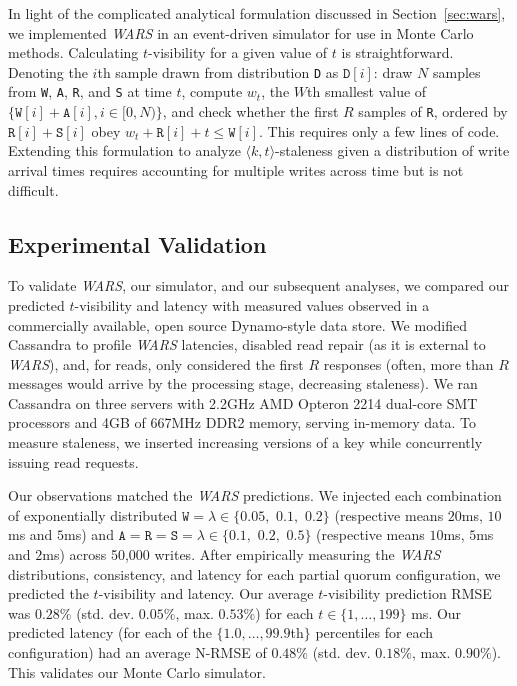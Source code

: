 \documentclass{vldb}
\begin{document}
In light of the complicated analytical formulation discussed in
Section~\ref{sec:wars}, we implemented \textit{WARS} in an
event-driven simulator for use in Monte Carlo methods.  Calculating
$t$-visibility for a given value of $t$ is straightforward. Denoting the
$i$th sample drawn from distribution \texttt{D} as $\texttt{D}[i]$:
draw $N$ samples from \texttt{W}, \texttt{A}, \texttt{R}, and
\texttt{S} at time $t$, compute $w_t$, the $W$th smallest value of $\{\texttt{W}[i]+\texttt{A}[i], i \in [0, N)\}$, and check whether the first
$R$ samples of \texttt{R}, ordered by $\texttt{R}[i]+\texttt{S}[i]$
obey $w_t+\texttt{R}[i] + t\leq \texttt{W}[i]$.  This requires only a
few lines of code.  Extending this formulation to analyze $\langle k,
t \rangle$-staleness given a distribution of write arrival times
requires accounting for multiple writes across time but is not
difficult.

\subsection{Experimental Validation}

To validate \textit{WARS}, our simulator, and our subsequent analyses,
we compared our predicted $t$-visibility and latency with measured
values observed in a commercially available, open source Dynamo-style
data store.  We modified Cassandra to profile \textit{WARS} latencies,
disabled read repair (as it is external to \textit{WARS}), and, for
reads, only considered the first $R$ responses (often, more than $R$
messages would arrive by the processing stage, decreasing staleness).
We ran Cassandra on three servers with 2.2GHz AMD Opteron 2214
dual-core SMT processors and 4GB of 667MHz DDR2 memory, serving
in-memory data.  To measure staleness, we inserted increasing versions of a key while concurrently issuing read requests.

Our observations matched the \textit{WARS} predictions. We injected
each combination of exponentially distributed $\texttt{W}=\lambda \in
\{0.05,$ $0.1,$ $0.2\}$ (respective means $20$ms, $10$ms and $5$ms)
and $\texttt{A}$$=$$\texttt{R}$$=$$\texttt{S}=\lambda \in \{0.1,$
$0.2,$ $0.5\}$ (respective means $10$ms, $5$ms and $2$ms) across
50,000 writes.  After empirically measuring the \textit{WARS}
distributions, consistency, and latency for each partial quorum
configuration, we predicted the $t$-visibility and latency. Our
average $t$-visibility prediction RMSE was $0.28\%$
(std. dev. $0.05\%$, max. $0.53\%$) for each
$t\in$$\{1,$$\dots,$$199\}$ ms. Our predicted latency (for each of the
$\{1.0, \dots, 99.9$th$\}$ percentiles for each configuration) had an
average N-RMSE of $0.48\%$ (std. dev. $0.18\%$, max. $0.90\%$).  This
validates our Monte Carlo simulator.
\end{document}
